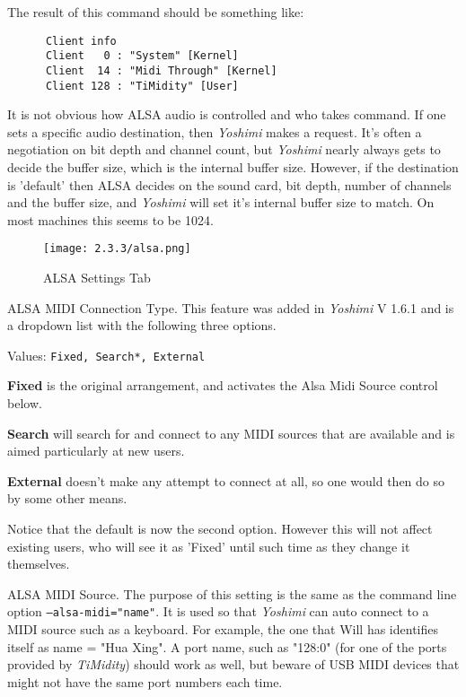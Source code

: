    The result of this command should be something like:

   \begin{verbatim}
      Client info
      Client   0 : "System" [Kernel]
      Client  14 : "Midi Through" [Kernel]
      Client 128 : "TiMidity" [User]
   \end{verbatim}

   It is not obvious how ALSA audio is controlled and who takes command.  If
   one sets a specific audio destination, then \textsl{Yoshimi} makes a
   request.  It's often a negotiation on bit depth and channel count, but
   \textsl{Yoshimi} nearly always gets to decide the buffer size, which is the
   internal buffer size.  However, if the destination is 'default' then ALSA
   decides on the sound card, bit depth, number of channels and the buffer
   size, and \textsl{Yoshimi} will set it's internal buffer size to match.  On
   most machines this seems to be 1024.

\begin{figure}[H]
   \centering
   \texttt{[image: 2.3.3/alsa.png]}
   \caption[ALSA Settings]{ALSA Settings Tab}
   \label{fig:yoshimi_settings_alsa_tab}
\end{figure}

   \setcounter{ItemCounter}{0}      %

   ALSA MIDI Connection Type.
   This feature was added in \textsl{Yoshimi} V 1.6.1 and is a dropdown
   list with the following three options.

   Values: \texttt{Fixed, Search*, External}

   \textbf{Fixed} is the original arrangement, and activates the Alsa Midi Source
   control below.

   \textbf{Search} will search for and connect to any MIDI sources that are
   available and is aimed particularly at new users.

   \textbf{External} doesn't make any attempt to connect at all, so one would
   then do so by some other means.

   Notice that the default is now the second option. However this will not
   affect existing users, who will see it as 'Fixed' until such time as they
   change it themselves.

   ALSA MIDI Source.
   The purpose of this setting is the same as the command line option
   \texttt{--alsa-midi="name"}.
   It is used so that \textsl{Yoshimi} can auto connect to a MIDI source
   such as a keyboard.  For example, the one that Will has identifies itself
   as name = "Hua Xing".
   A port name, such as "128:0" (for one of the ports provided by
   \textsl{TiMidity}) should work as well, but beware of USB MIDI devices that
   might not have the same port numbers each time.

